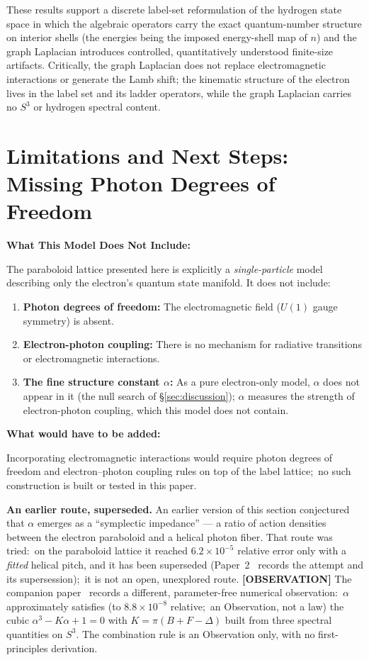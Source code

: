 \documentclass[aps,pra,twocolumn,superscriptaddress,longbibliography]{revtex4-2}
\newcommand{\gvc}[2]{#2}
\begin{document}
These results support a discrete label-set reformulation of the hydrogen state space in which the algebraic operators carry the exact quantum-number structure on interior shells (the energies being the imposed energy-shell map of $n$) and the graph Laplacian introduces controlled, quantitatively understood finite-size artifacts. Critically, \gvc{graph-s3-wall}{the graph Laplacian does not replace electromagnetic interactions or generate the Lamb shift; the kinematic structure of the electron lives in the label set and its ladder operators, while the graph Laplacian carries no $S^3$ or hydrogen spectral content}.


\section{Limitations and Next Steps: Missing Photon Degrees of Freedom}
\label{sec:limitations}

\textbf{What This Model Does Not Include:}

The paraboloid lattice presented here is explicitly a \textit{single-particle} model describing only the electron's quantum state manifold. It does not include:
\begin{enumerate}
\item \textbf{Photon degrees of freedom:} The electromagnetic field ($U(1)$ gauge symmetry) is absent.
\item \textbf{Electron-photon coupling:} There is no mechanism for radiative transitions or electromagnetic interactions.
\item \textbf{The fine structure constant $\alpha$:} As a pure electron-only model, $\alpha$ does not appear in it (the null search of \S\ref{sec:discussion}); $\alpha$ measures the strength of electron-photon coupling, which this model does not contain.
\end{enumerate}

\textbf{What would have to be added:}

Incorporating electromagnetic interactions would require photon degrees of freedom and electron--photon coupling rules on top of the label lattice;\ no such construction is built or tested in this paper.

\textbf{An earlier route, superseded.}  An earlier version of this section conjectured that $\alpha$ emerges as a ``symplectic impedance'' --- a ratio of action densities between the electron paraboloid and a helical photon fiber.  That route was tried:\ on the paraboloid lattice it reached $6.2\times10^{-5}$ relative error only with a \emph{fitted} helical pitch, and it has been superseded (Paper~2~\cite{companion_alpha} records the attempt and its supersession);\ it is not an open, unexplored route. \textbf{[OBSERVATION]} \gvc{k-combination-rule}{The companion paper~\cite{companion_alpha} records a different, parameter-free numerical observation:\ $\alpha$ approximately satisfies (to $8.8\times10^{-8}$ relative;\ an Observation, not a law) the cubic
$\alpha^3 - K\alpha + 1 = 0$ with $K = \pi(B + F - \Delta)$ built from three
spectral quantities on $S^3$}.  \gvc{k-combination-rule}{The combination rule is an Observation only, with no first-principles derivation}.
\end{document}
